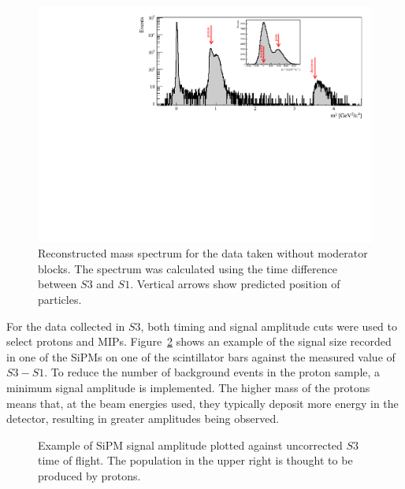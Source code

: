     \begin{figure}[h]
    \centering
    \includegraphics[width=0.9\linewidth]{files/Figures/Data_2018_8_31_b2_800MeV_0block_All.pdf}
		\caption{Reconstructed mass spectrum for the data taken without moderator blocks. The spectrum was calculated using the time difference between $S3$ and $S1$. Vertical arrows show predicted position of particles.}
		\label{fig:s3tof_mass}
	\end{figure}



    For the data collected in $S3$, both timing and signal amplitude cuts were used to select protons and MIPs.
	Figure~\ref{fig:TvsA} shows an example of the signal size recorded in one of the SiPMs on one of the scintillator bars against the measured value of $S3 - S1$.
	To reduce the number of background events in the proton sample, a minimum signal amplitude is implemented.
	The higher mass of the protons means that, at the beam energies used, they typically deposit more energy in the detector, resulting in greater amplitudes being observed.
	
	\begin{figure}[h]
		\begin{adjustbox}{max totalsize={.7\textwidth}, center}
			
		\end{adjustbox}
		\caption{Example of SiPM signal amplitude plotted against uncorrected $S3$ time of flight. The population in the upper right is thought to be produced by protons.}
		\label{fig:TvsA}
	\end{figure}
	